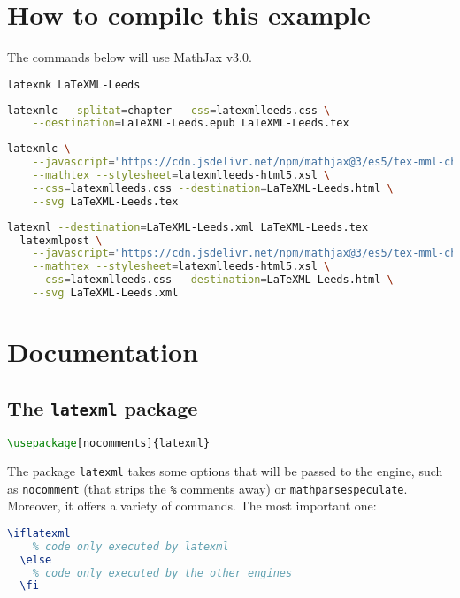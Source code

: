 \documentclass[a4paper]{article}
\theoremstyle{definition}
\begin{document}
\section{How to compile this example}
The commands below will use MathJax v3.0.
\begin{lstlisting}[language=bash,caption={Generate the PDF}]
  latexmk LaTeXML-Leeds
\end{lstlisting}
\begin{lstlisting}[language=bash,caption={Generate the EPUB}]
  latexmlc --splitat=chapter --css=latexmlleeds.css \
    --destination=LaTeXML-Leeds.epub LaTeXML-Leeds.tex
\end{lstlisting}
\begin{lstlisting}[language=bash,caption={Generate the HTML}]
  latexmlc \
    --javascript="https://cdn.jsdelivr.net/npm/mathjax@3/es5/tex-mml-chtml.js" \
    --mathtex --stylesheet=latexmlleeds-html5.xsl \
    --css=latexmlleeds.css --destination=LaTeXML-Leeds.html \
    --svg LaTeXML-Leeds.tex
\end{lstlisting}
\begin{lstlisting}[language=bash,caption={Generate the HTML in two steps}]
  latexml --destination=LaTeXML-Leeds.xml LaTeXML-Leeds.tex
  latexmlpost \
    --javascript="https://cdn.jsdelivr.net/npm/mathjax@3/es5/tex-mml-chtml.js"\
    --mathtex --stylesheet=latexmlleeds-html5.xsl \
    --css=latexmlleeds.css --destination=LaTeXML-Leeds.html \
    --svg LaTeXML-Leeds.xml
\end{lstlisting}

\section{Documentation}

\subsection{The \texttt{latexml} package}
\begin{lstlisting}[language=TeX,caption={Import \texttt{latexml} in the preamble}]
  \usepackage[nocomments]{latexml}
\end{lstlisting}

The package \verb|latexml| takes some options that will be passed to the \LaTeXML{} engine, such as \verb|nocomment| (that strips the \verb|%| comments away) or \verb|mathparsespeculate|. Moreover, it offers a variety of commands. The most important one:
\begin{lstlisting}[language=TeX]
  \iflatexml
    % code only executed by latexml
  \else
    % code only executed by the other engines
  \fi
\end{lstlisting}
\end{document}

